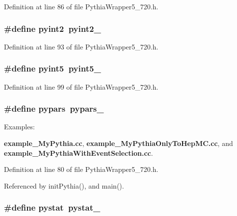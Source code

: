 Definition at line 86 of file Pythia\-Wrapper5\_\-720.h.
\subsubsection{\setlength{\rightskip}{0pt plus 5cm}\#define pyint2~{\bf pyint2\_\-}}\label{PythiaWrapper5__720_8h_02425c70e715c36246b83643ea25d4c4}




Definition at line 93 of file Pythia\-Wrapper5\_\-720.h.
\subsubsection{\setlength{\rightskip}{0pt plus 5cm}\#define pyint5~{\bf pyint5\_\-}}\label{PythiaWrapper5__720_8h_eaf2a9dbc5f0cc71eb806a0901b4dc90}




Definition at line 99 of file Pythia\-Wrapper5\_\-720.h.
\subsubsection{\setlength{\rightskip}{0pt plus 5cm}\#define pypars~{\bf pypars\_\-}}\label{PythiaWrapper5__720_8h_8da7c9220b540db4b5ab2b9dce72eb8c}


\begin{Desc}
\item[Examples: ]\par
{\bf example\_\-My\-Pythia.cc}, {\bf example\_\-My\-Pythia\-Only\-To\-Hep\-MC.cc}, and {\bf example\_\-My\-Pythia\-With\-Event\-Selection.cc}.\end{Desc}


Definition at line 80 of file Pythia\-Wrapper5\_\-720.h.

Referenced by init\-Pythia(), and main().
\subsubsection{\setlength{\rightskip}{0pt plus 5cm}\#define pystat~pystat\_\-}\label{PythiaWrapper5__720_8h_1237254f076fc7dfb0519e6b4d5b0f3e}




